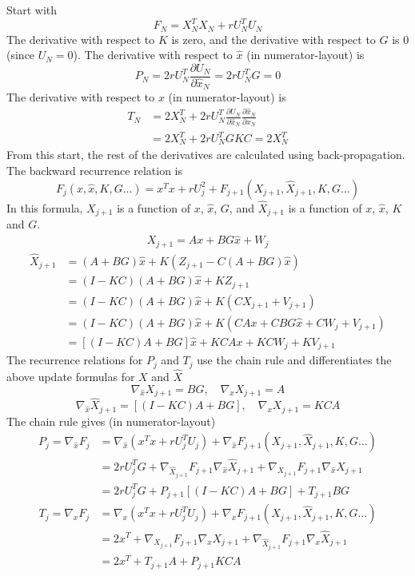 \documentclass{article}
\begin{document}
\noindent Start with 
\[
F_N = X_N^T X_N + rU_N^T U_N
\]
The derivative with respect to $K$ is zero, and the derivative with respect to $G$ is 0 (since $U_N = 0$).
The derivative with respect to $\widehat{x}$ (in numerator-layout) is
\[
P_N =  2rU_N^T\frac{\partial U_N}{\partial \widehat{x}_N} = 2rU_N^TG = 0
\]
The derivative with respect to $x$ (in numerator-layout) is
\begin{align*}
T_N &= 2X^T_N + 2rU_N^T\frac{\partial U_N}{\partial \widehat{x}_N}\frac{\partial \widehat{x}_N}{\partial x_N} \\
&= 2X^T_N + 2rU_N^TGKC = 2X^T_N
\end{align*}
From this start, the rest of the derivatives are calculated using back-propagation.
The backward recurrence relation is
\[
F_j(x,\widehat{x},K,G\ldots) = x^T x + rU_j^2 + F_{j+1}(X_{j+1},\widehat{X}_{j+1}, K,G\ldots)
\]
In this formula, $X_{j+1}$ is a function of $x$, $\widehat{x}$, $G$, and $\widehat{X}_{j+1}$ is a function of $x$, $\widehat{x}$, $K$ and $G$.
\begin{align*}
X_{j+1} = Ax + BG\widehat{x} + W_j
\end{align*}
\begin{align*}
\widehat{X}_{j+1} &=  (A+BG) \widehat{x}  + K(Z_{j+1} - C(A+BG)\widehat{x}) \\
& = (I-KC)(A+BG) \widehat{x} + KZ_{j+1} \\
&= (I-KC)(A+BG) \widehat{x} + K(CX_{j+1} + V_{j+1}) \\
&= (I-KC)(A+BG)\widehat{x}+K(CAx+CBG\widehat{x}+CW_j+V_{j+1})\\
&= [(I-KC)A+BG]\widehat{x}+KCAx+KCW_j+KV_{j+1} 
\end{align*}
The recurrence relations for $P_j$ and $T_j$ use the chain rule and differentiates the above update formulas for $X$ and $\widehat{X}$ 
\[
\nabla_{\widehat{x}} X_{j+1} = BG, \quad \nabla_{x} X_{j+1} = A
\]
\[
\nabla_{\widehat{x}} \widehat{X}_{j+1} = [(I-KC)A + BG], \quad \nabla_{x} X_{j+1} = KCA
\]
The chain rule gives (in numerator-layout)
\begin{align*}
P_j = \nabla_{\widehat{x}} F_j 
&= \nabla_{\widehat{x}}(x^Tx + rU_j^TU_j)
+ \nabla_{\widehat{x}}F_{j+1}(X_{j+1},\widehat{X}_{j+1},K,G \ldots) \\
&= 2rU_j^TG + \nabla_{\widehat{X}_{j+1}}F_{j+1} \nabla_{\widehat{x}} \widehat{X}_{j+1}+ \nabla_{X_{j+1}}F_{j+1} \nabla_{\widehat{x}} X_{j+1}\\
&= 2rU_j^TG 
+ P_{j+1}[(I-KC)A + BG] + T_{j+1}BG
\end{align*}
\begin{align*}
T_j = \nabla_{x} F_j &= \nabla_{x}(x^Tx + rU_j^TU_j) + \nabla_{x}F_{j+1}(X_{j+1},\widehat{X}_{j+1},K,G \ldots) \\
&= 2x^T  + \nabla_{X_{j+1}}F_{j+1} \nabla_{x} X_{j+1} + \nabla_{\widehat{X}_{j+1}}F_{j+1} \nabla_{x} \widehat{X}_{j+1} \\
&= 2x^T  + T_{j+1}A + P_{j+1}KCA 
\end{align*}
\end{document}
